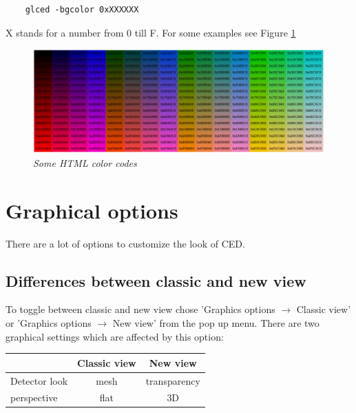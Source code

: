 \documentclass[a4paper,10pt]{article}
\begin{document}
\begin{verbatim}
	glced -bgcolor 0xXXXXXX
\end{verbatim}

X stands for a number from 0 till F.
For some examples see Figure \ref{html}
\begin{figure}[h]
\setlength{\fboxsep}{0mm}
\centerline{\includegraphics[width=1\linewidth]{html_colors1.png}}
\caption{\label{html}\textsl{Some HTML color codes}}
\end{figure}

\section{Graphical options}
There are a lot of options to customize the look of CED.

\subsection{Differences between classic and new view}
To toggle between classic and new view chose 'Graphics options $\rightarrow$ Classic view' or 'Graphics options $\rightarrow$ New view' from the pop up menu. There are two graphical settings which are affected by this option:
 \begin{center}
 \begin{tabular}[ht]{|l|c|c|}
  \hline
  &Classic view & New view\\
  \hline
  Detector look & mesh & transparency\\
  perspective & flat & 3D\\
  \hline
\end{tabular}
\end{center}
\end{document}

